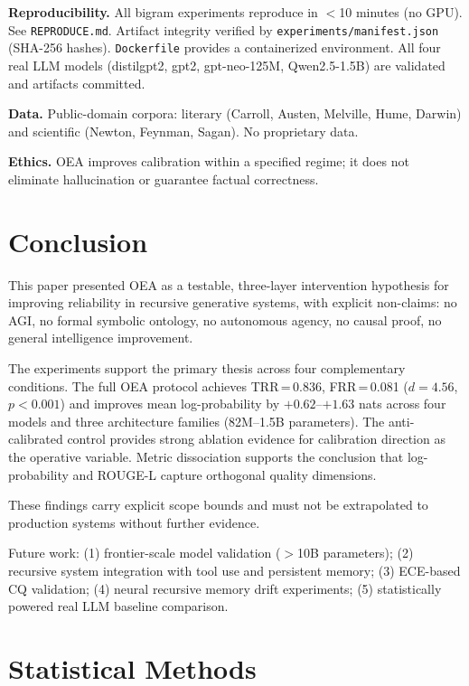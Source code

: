 \documentclass[11pt]{article}
\begin{document}
\textbf{Reproducibility.} All bigram experiments reproduce in $<$10 minutes (no GPU). See \texttt{REPRODUCE.md}. Artifact integrity verified by \texttt{experiments/manifest.json} (SHA-256 hashes). \texttt{Dockerfile} provides a containerized environment. All four real LLM models (distilgpt2, gpt2, gpt-neo-125M, Qwen2.5-1.5B) are validated and artifacts committed.

\textbf{Data.} Public-domain corpora: literary (Carroll, Austen, Melville, Hume, Darwin) and scientific (Newton, Feynman, Sagan). No proprietary data.

\textbf{Ethics.} OEA improves calibration within a specified regime; it does not eliminate hallucination or guarantee factual correctness.

\section{Conclusion}
\label{sec:conclusion}

This paper presented OEA as a testable, three-layer intervention hypothesis for improving reliability in recursive generative systems, with explicit non-claims: no AGI, no formal symbolic ontology, no autonomous agency, no causal proof, no general intelligence improvement.

The experiments support the primary thesis across four complementary conditions. The full OEA protocol achieves TRR\,=\,0.836, FRR\,=\,0.081 ($d=4.56$, $p<0.001$) and improves mean log-probability by $+0.62$--$+1.63$ nats across four models and three architecture families (82M--1.5B parameters). The anti-calibrated control provides strong ablation evidence for calibration direction as the operative variable. Metric dissociation supports the conclusion that log-probability and ROUGE-L capture orthogonal quality dimensions.

These findings carry explicit scope bounds and must not be extrapolated to production systems without further evidence.

Future work: (1) frontier-scale model validation ($>$10B parameters); (2) recursive system integration with tool use and persistent memory; (3) ECE-based CQ validation; (4) neural recursive memory drift experiments; (5) statistically powered real LLM baseline comparison.

\appendix

\section{Statistical Methods}
\label{app:stats}
\end{document}
